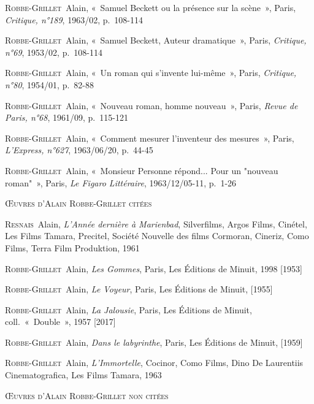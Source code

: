 \documentclass[12pt, a4paper]{article}
\begin{document}
	\textsc{Robbe-Grillet}~Alain, «~Samuel Beckett ou la présence sur la scène~», Paris, \textit{Critique, n°189}, 1963/02, p.~108-114\par
	\textsc{Robbe-Grillet}~Alain, «~Samuel Beckett, Auteur dramatique~», Paris, \textit{Critique, n°69}, 1953/02, p.~108-114\par
	\textsc{Robbe-Grillet}~Alain, «~Un roman qui s'invente lui-même~», Paris, \textit{Critique, n°80}, 1954/01, p.~82-88\par
	\textsc{Robbe-Grillet}~Alain, «~Nouveau roman, homme nouveau~», Paris, \textit{Revue de Paris, n°68}, 1961/09, p.~115-121\par
	\textsc{Robbe-Grillet}~Alain, «~Comment mesurer l'inventeur des mesures~», Paris, \textit{L'Express, n°627}, 1963/06/20, p.~44-45\par
	\textsc{Robbe-Grillet}~Alain, «~Monsieur Personne répond... Pour un "nouveau roman"~», Paris, \textit{Le Figaro Littéraire}, 1963/12/05-11, p.~1-26\par
	
		\vspace*{2cm}
		\setlength{\parindent}{0cm}
{\large\textsc{Œuvres d'Alain Robbe-Grillet citées}}
		\vspace*{1cm}
		\setlength{\parindent}{25pt}
		
		
		

		
		\textsc{Resnais}~Alain, \textit{L'Année dernière à Marienbad}, Silverfilms, Argos Films, Cinétel, Les Films Tamara, Precitel, Société Nouvelle des films Cormoran, Cineriz, Como Films, Terra Film Produktion, 1961\par 
	\textsc{Robbe-Grillet}~Alain, \textit{Les Gommes}, Paris, Les Éditions de Minuit, 1998 [1953]\par 
	\textsc{Robbe-Grillet}~Alain, \textit{Le Voyeur}, Paris, Les Éditions de Minuit,  [1955]\par 
	\textsc{Robbe-Grillet}~Alain, \textit{La Jalousie}, Paris, Les Éditions de Minuit, coll.~«~Double~», 1957 [2017]\par 
	\textsc{Robbe-Grillet}~Alain, \textit{Dans le labyrinthe}, Paris, Les Éditions de Minuit,  [1959]\par 
	\textsc{Robbe-Grillet}~Alain, \textit{L'Immortelle}, Cocinor, Como Films, Dino De Laurentiis Cinematografica, Les Films Tamara, 1963\par 
	
		\vspace*{2cm}
		\setlength{\parindent}{0cm}
{\large\textsc{Œuvres d'Alain Robbe-Grillet non citées}}
		\vspace*{1cm}
		\setlength{\parindent}{25pt}
		
\end{document}
